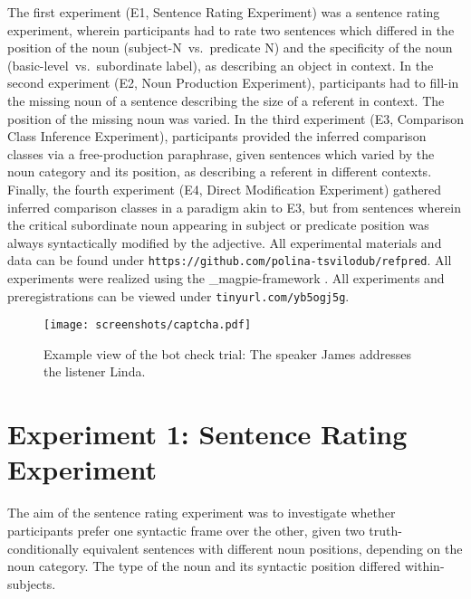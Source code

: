 The first experiment (E1, Sentence Rating Experiment) was a sentence rating experiment, wherein participants had to rate two sentences which differed in the position of the noun (subject-N~vs.~predicate N) and the specificity of the noun (basic-level~vs.~subordinate label), as describing an object in context. 
In the second experiment (E2, Noun Production Experiment), participants had to fill-in the missing noun of a sentence describing the size of a referent in context. The position of the missing noun was varied. 
In the third experiment (E3, Comparison Class Inference Experiment), participants provided the inferred comparison classes via a free-production paraphrase, given sentences which varied by the noun category and its position, as describing a referent in different contexts. 
Finally, the fourth experiment (E4, Direct Modification Experiment) gathered inferred comparison classes in a paradigm akin to E3, but from sentences wherein the critical subordinate noun appearing in subject or predicate position was always syntactically modified by the adjective. 
All experimental materials and data can be found under \texttt{https://github.com/polina-tsvilodub/refpred}. All experiments were realized using the \_magpie-framework \parencite{magpie}. 
All experiments and preregistrations can be viewed under \texttt{tinyurl.com/yb5ogj5g}. %
\begin{figure*}[t]
	\begin{center}
		\texttt{[image: screenshots/captcha.pdf]}
	\end{center}
	\vspace{-1.5cm}
	\caption{Example view of the bot check trial: The speaker James addresses the listener Linda.}
	\label{captcha}
\end{figure*}

\section{Experiment 1: Sentence Rating Experiment}

The aim of the sentence rating experiment was to investigate whether participants prefer one syntactic frame over the other, given two truth-conditionally equivalent sentences with different noun positions, depending on the noun category. The type of the noun and its syntactic position differed within-subjects.

